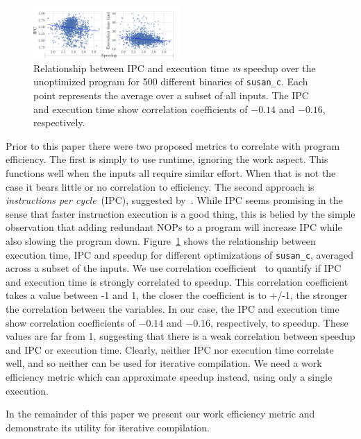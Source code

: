     \begin{figure}[t]
        \centering
        \includegraphics[width=0.5\textwidth]{figs/motivation-metric.pdf}
        \caption{
            Relationship between IPC and execution time \textit{vs} speedup over the unoptimized program
            for 500 different binaries of \texttt{susan\_c}.
            Each point represents the average over a subset of all inputs.
            The IPC and execution time show correlation coefficients of $-0.14$ and $-0.16$, respectively.
        }
        \label{fig:motivation-metric}
    \end{figure}

    Prior to this paper there were two proposed metrics to correlate with program efficiency. The first is simply to use runtime, ignoring
    the work aspect. This functions well when the inputs all require similar effort. When that is not the case it bears little or no
    correlation to efficiency. The second approach is \textit{instructions per cycle}~(IPC), suggested by~\citep{fursin07}. While IPC seems
    promising in the sense that faster instruction execution is a good thing, this is belied by the simple observation that adding
    redundant NOPs to a program will increase IPC while also slowing the program down. Figure~\ref{fig:motivation-metric} shows the
    relationship between execution time, IPC and speedup for different optimizations of \texttt{susan\_c}, averaged across a subset of the
    inputs. We use correlation coefficient~\cite{Bishop:2006:PRM:1162264} to quantify if  IPC and execution time is strongly correlated to
    speedup. This correlation coefficient takes a value between -1 and 1, the closer the coefficient is to +/-1, the stronger the
    correlation between the variables. In our case, the IPC and execution time show correlation coefficients of $-0.14$ and $-0.16$,
    respectively, to speedup. These values are far from 1, suggesting that there is a weak correlation between speedup and IPC or
    execution time. Clearly, neither IPC nor execution time correlate well, and so neither can be used for iterative compilation. We need a work efficiency
    metric which can approximate speedup instead, using only a single execution.

    In the remainder of this paper we present our work efficiency metric and demonstrate its utility for iterative compilation.
